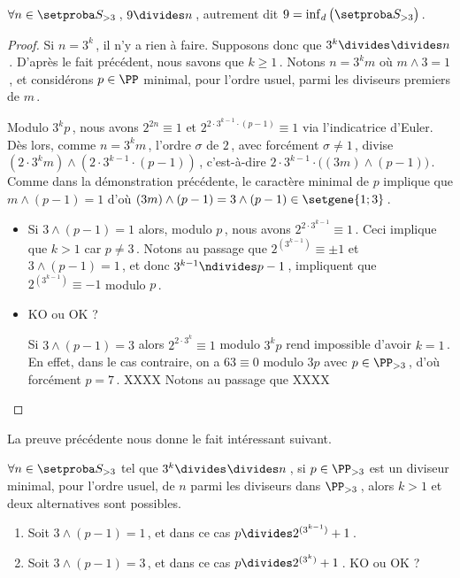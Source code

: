 

\begin{fact}
	$\forall n \in \ourset_{>3}$\,, $9 \divides n$\,, autrement dit $9 = \dinf \big( \ourset_{>3} \big)$\,.
\end{fact}

\begin{proof}
	Si $n = 3^k$\,, il n'y a rien à faire. Supposons donc que $3^k \strictdivides n$\,. 
	D'après le fait précédent, nous savons que $k \geq 1$\,. Notons $n = 3^k m$ où $m \wedge 3 = 1$\,, et considérons $p\in\PP$ minimal, pour l'ordre usuel, parmi les diviseurs premiers de $m$\,.
	
	\medskip

	Modulo $3^k p$\,, nous avons
	$2^{2n} \equiv 1$
	et
	$2^{2 \cdot 3^{k-1} \cdot (p-1)} \equiv 1$
	via l'indicatrice d'Euler.
	Dès lors, comme $n = 3^k m$\,, l'ordre $\sigma$ de $2$\,, avec forcément $\sigma \neq 1$\,, divise 
	$(2 \cdot 3^k m) \wedge (2 \cdot 3^{k-1} \cdot (p-1))$\,,
	c'est-à-dire
	$2 \cdot 3^{k-1} \cdot \big( (3 m) \wedge (p-1) \big)$\,.
	Comme dans la démonstration précédente, le caractère minimal de $p$ implique que 
	$m \wedge (p-1) = 1$
	d'où
	$(3 m) \wedge (p-1) = 3 \wedge (p-1) \in \setgene{1 ; 3}$\,.
	\begin{itemize}
		\item Si $3 \wedge (p-1) = 1$ alors, modulo $p$\,,
		nous avons $2^{2 \cdot 3^{k-1}} \equiv 1$\,.
		Ceci implique que $k > 1$ car $p \neq 3$\,.
		Notons au passage que
		$2^{(3^{k-1})} \equiv \pm 1$
		et
		$3 \wedge (p-1) = 1$\,,
		et donc
		$3^{k-1} \ndivides p-1$\,,
		impliquent que
		$2^{(3^{k-1})} \equiv -1$ modulo $p$\,.

		\item KO ou OK ?
		
		Si $3 \wedge (p-1) = 3$ alors $2^{2 \cdot 3^k} \equiv 1$ modulo $3^k p$ rend impossible d'avoir $k = 1$\,.
		En effet, dans le cas contraire, on a $63 \equiv 0$ modulo $3 p$ avec $p \in \PP_{>3}$\,, d'où forcément $p = 7$\,.
		XXXX
		Notons au passage que
		XXXX	
	\end{itemize}
\end{proof}



La preuve précédente nous donne le fait intéressant suivant.

\begin{fact}
	$\forall n \in \ourset_{>3}$ tel que $3^k \strictdivides n$\,, si $p \in \PP_{>3}$ est un diviseur minimal, pour l'ordre usuel, de $n$ parmi les diviseurs dans $\PP_{>3}$\,, alors $k > 1$ et deux alternatives sont possibles.
	\begin{enumerate}
		\item Soit $3 \wedge (p-1) = 1$\,, et dans ce cas $p \divides 2^{(3^{k-1})} + 1$\,.

		\item Soit $3 \wedge (p-1) = 3$\,, et dans ce cas $p \divides 2^{(3^k)} + 1$\,. KO ou OK ?
	\end{enumerate}
\end{fact}

